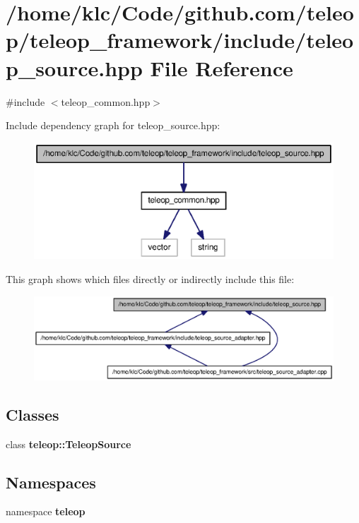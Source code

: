 \section{/home/klc/Code/github.com/teleop/teleop\_\-framework/include/teleop\_\-source.hpp File Reference}
\label{teleop__source_8hpp}
{\ttfamily \#include $<$teleop\_\-common.hpp$>$}\par
Include dependency graph for teleop\_\-source.hpp:
\nopagebreak
\begin{figure}[H]
\begin{center}
\leavevmode
\includegraphics[width=400pt]{teleop__source_8hpp__incl}
\end{center}
\end{figure}
This graph shows which files directly or indirectly include this file:
\nopagebreak
\begin{figure}[H]
\begin{center}
\leavevmode
\includegraphics[width=400pt]{teleop__source_8hpp__dep__incl}
\end{center}
\end{figure}
\subsection*{Classes}
\begin{DoxyCompactItemize}
\item 
class {\bf teleop::TeleopSource}
\end{DoxyCompactItemize}
\subsection*{Namespaces}
\begin{DoxyCompactItemize}
\item 
namespace {\bf teleop}
\end{DoxyCompactItemize}
